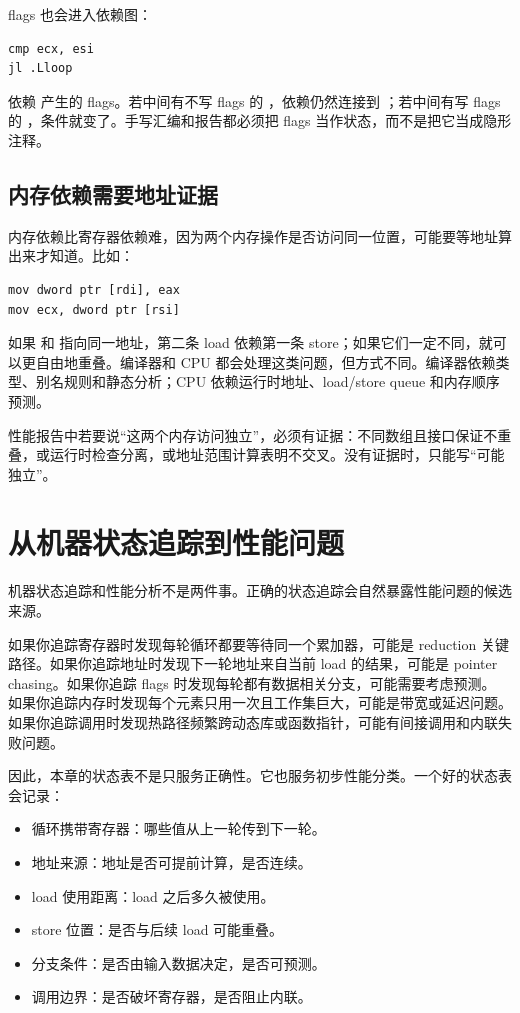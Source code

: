 flags 也会进入依赖图：

\begin{lstlisting}
cmp ecx, esi
jl .Lloop
\end{lstlisting}

 依赖  产生的 flags。若中间有不写 flags 的 ，依赖仍然连接到 ；若中间有写 flags 的 ，条件就变了。手写汇编和报告都必须把 flags 当作状态，而不是把它当成隐形注释。

\subsection{内存依赖需要地址证据}

内存依赖比寄存器依赖难，因为两个内存操作是否访问同一位置，可能要等地址算出来才知道。比如：

\begin{lstlisting}
mov dword ptr [rdi], eax
mov ecx, dword ptr [rsi]
\end{lstlisting}

如果  和  指向同一地址，第二条 load 依赖第一条 store；如果它们一定不同，就可以更自由地重叠。编译器和 CPU 都会处理这类问题，但方式不同。编译器依赖类型、别名规则和静态分析；CPU 依赖运行时地址、load/store queue 和内存顺序预测。

性能报告中若要说“这两个内存访问独立”，必须有证据：不同数组且接口保证不重叠，或运行时检查分离，或地址范围计算表明不交叉。没有证据时，只能写“可能独立”。

\section{从机器状态追踪到性能问题}

机器状态追踪和性能分析不是两件事。正确的状态追踪会自然暴露性能问题的候选来源。

如果你追踪寄存器时发现每轮循环都要等待同一个累加器，可能是 reduction 关键路径。如果你追踪地址时发现下一轮地址来自当前 load 的结果，可能是 pointer chasing。如果你追踪 flags 时发现每轮都有数据相关分支，可能需要考虑预测。 如果你追踪内存时发现每个元素只用一次且工作集巨大，可能是带宽或延迟问题。如果你追踪调用时发现热路径频繁跨动态库或函数指针，可能有间接调用和内联失败问题。

因此，本章的状态表不是只服务正确性。它也服务初步性能分类。一个好的状态表会记录：

\begin{itemize}
  \item 循环携带寄存器：哪些值从上一轮传到下一轮。
  \item 地址来源：地址是否可提前计算，是否连续。
  \item load 使用距离：load 之后多久被使用。
  \item store 位置：是否与后续 load 可能重叠。
  \item 分支条件：是否由输入数据决定，是否可预测。
  \item 调用边界：是否破坏寄存器，是否阻止内联。
\end{itemize}

